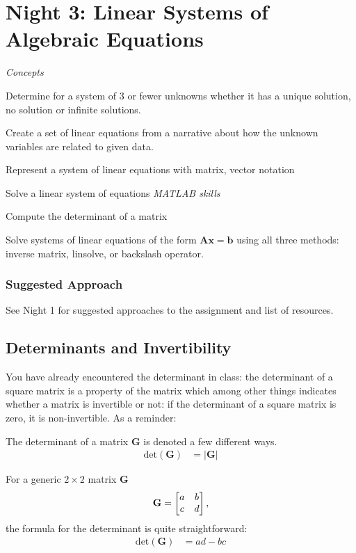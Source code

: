 \chapter{Night 3: Linear Systems of Algebraic Equations}

\begin{learningobjectives}
\emph{Concepts}
\bi
\item Determine for a system of 3 or fewer unknowns whether it has a unique solution, no solution or infinite solutions.
\item Create a set of linear equations from a narrative about how the unknown variables are related to given data.
\item Represent a system of linear equations with matrix, vector notation
\item Solve a linear system of equations
\ei
\emph{MATLAB skills}
\bi
\item Compute the determinant of a matrix
\item Solve systems of linear equations of the form $\mathbf{A} \mathbf{x} = \mathbf{b}$ using all three methods: inverse matrix, linsolve, or backslash operator.
\ei
\end{learningobjectives}

\subsection{Suggested Approach}

See Night 1 for suggested approaches to the assignment and list of resources.

\section{Determinants and Invertibility}

You have already encountered the determinant in class:  the determinant of a square matrix is a property of the matrix which among other things indicates whether a matrix is invertible or not:  if the determinant of a square matrix is zero, it is non-invertible.  As a reminder:

The determinant of a matrix $\mathbf{G}$ is denoted a few different ways.
\begin{align}
\mbox{det}(\mathbf{G}) &= |\mathbf{G}|
\end{align}

For a generic $2\times 2$ matrix $\mathbf{G}$
\[ \mathbf{G} = \begin{bmatrix} a & b \\ c & d\end{bmatrix}, \]
the formula for the determinant is quite straightforward:
\begin{align}
\mbox{det}(\mathbf{G}) &= ad - bc
\end{align}

